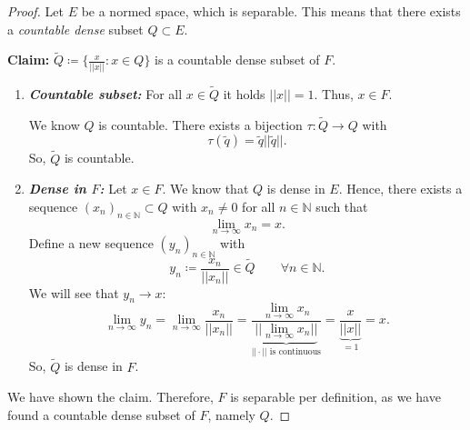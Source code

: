 \documentclass[a4paper]{article}
\newcommand{\vip}[1]{\textit{\textbf{#1}}}
\begin{document}
\begin{proof}
Let $E$ be a normed space, which is separable. This means that there exists a \emph{countable dense} subset $Q \subset E$.

\textbf{Claim:} $\tilde Q \coloneqq \{ \frac{x}{||x||} : x \in Q \}$ is a countable dense subset of $F$.

\begin{enumerate}
    \item \vip{Countable subset:} For all $x \in \tilde Q$ it holds $||x|| = 1$. Thus, $x \in F$.
    
    We know $Q$ is countable. There exists a bijection $\tau: \tilde Q \to Q$ with $$\tau(\tilde q) = \tilde q ||\tilde q||.$$ So, $\tilde Q$ is countable.
    
    \item \vip{Dense in $F$:} Let $x \in F$. We know that $Q$ is dense in $E$. Hence, there exists a sequence $(x_n)_{n \in \mathbb N} \subset Q$ with $x_n \neq 0$ for all $n \in \mathbb N$ such that 
    \[
        \lim_{n \to \infty}x_n = x.
    \]
    Define a new sequence $(y_n)_{n \in \mathbb N}$ with
    \[
        y_n \coloneqq \frac{x_n}{||x_n||} \in \tilde Q \qquad \forall n \in \mathbb N.
    \]
    We will see that $y_n \to x$:
    \[
        \lim_{n \to \infty}y_n = \lim_{n \to \infty} \frac{x_n}{||x_n||} = \frac{\lim_{n \to \infty} x_n}{\underbrace{||\lim_{n \to \infty}x_n||}_{||\cdot|| \text{ is continuous}}} = \frac{x}{\underbrace{||x||}_{= 1}} = x.
    \]
    So, $\tilde Q$ is dense in $F$.
\end{enumerate}
We have shown the claim. Therefore, $F$ is separable per definition, as we have found a countable dense subset of $F$, namely $Q$.
\end{proof}
\end{document}
